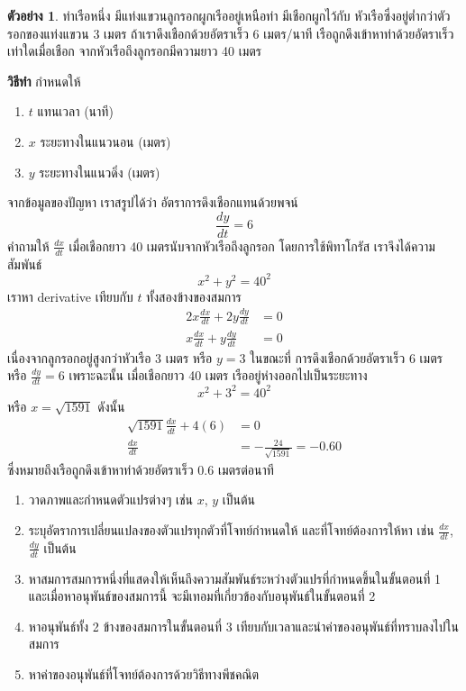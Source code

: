 \documentclass[
]{book}
\theoremstyle{definition}
\theoremstyle{definition}
\newtheorem{example}{ตัวอย่าง}[chapter]
\theoremstyle{definition}
\theoremstyle{definition}
\theoremstyle{remark}
\begin{document}
\begin{example}
ท่าเรือหนึ่ง มีแท่งแขวนลูกรอกผูกเรืออยู่เหนือท่า มีเชือกผูกไว้กับ
หัวเรือซึ่งอยู่ต่ำกว่าตัวรอกของแท่งแขวน 3 เมตร ถ้าเราดึงเชือกด้วยอัตราเร็ว 6 เมตร/นาที
เรือถูกดึงเข้าหาท่าด้วยอัตราเร็วเท่าใดเมื่อเชือก จากหัวเรือถึงลูกรอกมีความยาว 40 เมตร
\end{example}

\textbf{วิธีทำ} กำหนดให้

\begin{enumerate}
\def\labelenumi{\arabic{enumi}.}
\item
  \(t\) แทนเวลา (นาที)
\item
  \(x\) ระยะทางในแนวนอน (เมตร)
\item
  \(y\) ระยะทางในแนวดิ่ง (เมตร)
\end{enumerate}

จากข้อมูลของปัญหา เราสรูปได้ว่า อัตราการดึงเชือกแทนด้วยพจน์ \[\frac{dy}{dt} = 6\]
คำถามให้ \(\frac{dx}{dt}\) เมื่อเชือกยาว 40 เมตรนับจากหัวเรือถึงลูกรอก
โดยการใช้พิทาโกรัส เราจึงได้ความสัมพันธ์ \[x^2+y^2 = 40^2\] เราหา derivative
เทียบกับ \(t\) ทั้งสองข้างของสมการ \begin{equation}   \begin{aligned}
    2x \frac{dx}{dt} + 2y\frac{dy}{dt} &= 0 \\
    x \frac{dx}{dt} + y\frac{dy}{dt} &= 0
  \end{aligned} \end{equation} เนื่องจากลูกรอกอยู่สูงกว่าหัวเรือ 3 เมตร หรือ \(y=3\) ในขณะที่
การดึงเชือกด้วยอัตราเร็ว 6 เมตร หรือ \(\frac{dy}{dt} = 6\) เพราะฉะนั้น เมื่อเชือกยาว
40 เมตร เรืออยู่ห่างออกไปเป็นระยะทาง \[x^2 + 3^2 = 40^2\] หรือ
\(x = \sqrt{1591}\) ดังนั้น \begin{equation}   \begin{aligned}
    \sqrt{1591}\frac{dx}{dt} + 4(6) &= 0 \\
    \frac{dx}{dt} &= -\frac{24}{\sqrt{1591}} = -0.60
  \end{aligned} \end{equation} ซึ่งหมายถึงเรือถูกดึงเข้าหาท่าด้วยอัตราเร็ว 0.6 เมตรต่อนาที

\begin{enumerate}
\def\labelenumi{\arabic{enumi}.}
\item
  วาดภาพและกำหนดตัวแปรต่างๆ เช่น \(x\), \(y\) เป็นต้น
\item
  ระบุอัตราการเปลี่ยนแปลงของตัวแปรทุกตัวที่โจทย์กำหนดให้ และที่โจทย์ต้องการให้หา เช่น
  \(\displaystyle\frac{dx}{dt}\), \(\displaystyle\frac{dy}{dt}\) เป็นต้น
\item
  หาสมการสมการหนึ่งที่แสดงให้เห็นถึงความสัมพันธ์ระหว่างตัวแปรที่กำหนดขึ้นในขั้นตอนที่ 1
  และเมื่อหาอนุพันธ์ของสมการนี้ จะมีเทอมที่เกี่ยวข้องกับอนุพันธ์ในขั้นตอนที่ 2
\item
  หาอนุพันธ์ทั้ง 2 ข้างของสมการในขั้นตอนที่ 3
  เทียบกับเวลาและนำค่าของอนุพันธ์ที่ทราบลงไปในสมการ
\item
  หาค่าของอนุพันธ์ที่โจทย์ต้องการด้วยวิธีทางพีชคณิต
\end{enumerate}
\end{document}
